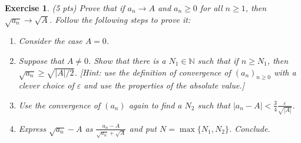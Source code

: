 \documentclass[12pt]{article}
\newcommand{\bN}{\mathbb{N}}
\newcommand{\ra}{\rightarrow}
\theoremstyle{plain}
\newtheorem{exer}{\textbf{Exercise}}}
\theoremstyle{plain}
\theoremstyle{plain}
\theoremstyle{plain}
\begin{document}
\begin{exer}
(5 pts)
Prove that if $a_n \ra A$ and $a_n \geq 0$ for all $n \geq 1$, then $\sqrt{a_n} \ra \sqrt{A}$. Follow the following steps to prove it:
	\begin{enumerate}
	\item Consider the case $A = 0$.
	\item Suppose that $A \neq 0$. Show that there is a $N_1 \in \bN$ such that if $n \geq N_1$, then $\sqrt{a_n} \geq \sqrt{|A|/2}$. [Hint: use the definition of convergence of $(a_n)_{n \geq 0}$ with a clever choice of $\varepsilon$ and use the properties of the absolute value.]
	\item Use the convergence of $(a_n)$ again to find a $N_2$ such that $|a_n - A| < \frac{3}{4} \frac{\varepsilon}{\sqrt{|A|}}$. 
	\item Express $\sqrt{a_n} - A$ as $\frac{a_n - A}{\sqrt{a_n} + \sqrt{A}}$ and put $N = \max \{ N_1 , N_2 \}$. Conclude.
	\end{enumerate}
\end{exer}
\end{document}
